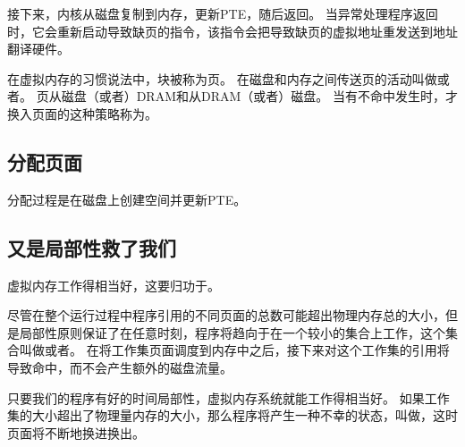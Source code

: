 {{        接下来，内核从磁盘复制到内存，更新PTE，随后返回。
        当异常处理程序返回时，它会重新启动导致缺页的指令，该指令会把导致缺页的虚拟地址重发送到地址翻译硬件。

        在虚拟内存的习惯说法中，块被称为页。
        在磁盘和内存之间传送页的活动叫做或者。
        页从磁盘（或者）DRAM和从DRAM（或者）磁盘。
        当有不命中发生时，才换入页面的这种策略称为。
    }

    \subsection{分配页面}
    {
        分配过程是在磁盘上创建空间并更新PTE。
    }

    \subsection{又是局部性救了我们}
    {
        虚拟内存工作得相当好，这要归功于。

        尽管在整个运行过程中程序引用的不同页面的总数可能超出物理内存总的大小，但是局部性原则保证了在任意时刻，程序将趋向于在一个较小的集合上工作，这个集合叫做或者。
        在将工作集页面调度到内存中之后，接下来对这个工作集的引用将导致命中，而不会产生额外的磁盘流量。

        只要我们的程序有好的时间局部性，虚拟内存系统就能工作得相当好。
        如果工作集的大小超出了物理量内存的大小，那么程序将产生一种不幸的状态，叫做，这时页面将不断地换进换出。
    }
}
